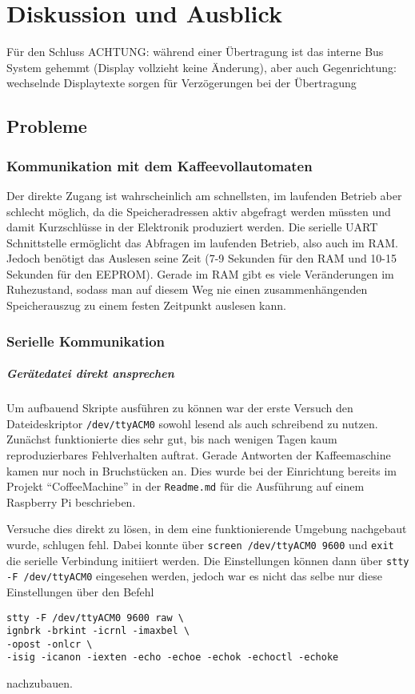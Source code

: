 \chapter{Diskussion und Ausblick}
\todo
Für den Schluss
ACHTUNG: während einer Übertragung ist das interne Bus System gehemmt (Display vollzieht keine Änderung), aber auch Gegenrichtung: wechselnde Displaytexte sorgen für Verzögerungen bei der Übertragung
\todo

\section{Probleme}

\subsection{Kommunikation mit dem Kaffeevollautomaten} \label{subsec:zugangSeriellDirekt}
Der direkte Zugang ist wahrscheinlich am schnellsten, im laufenden Betrieb aber schlecht möglich, da die Speicheradressen aktiv abgefragt werden müssten und damit Kurzschlüsse in der Elektronik produziert werden.
Die serielle \ac{UART} Schnittstelle ermöglicht das Abfragen im laufenden Betrieb, also auch im \ac{RAM}.
Jedoch benötigt das Auslesen seine Zeit (7-9 Sekunden für den \ac{RAM} und 10-15 Sekunden für den \ac{EEPROM}).
Gerade im \ac{RAM} gibt es viele Veränderungen im Ruhezustand, sodass man auf diesem Weg nie einen zusammenhängenden Speicherauszug zu einem festen Zeitpunkt auslesen kann.

\subsection{Serielle Kommunikation} \label{subsec:kommunikationGeraetedateiLibserialLibrary}
\paragraph{Gerätedatei direkt ansprechen}
Um aufbauend Skripte ausführen zu können war der erste Versuch den Dateideskriptor \texttt{/dev/ttyACM0} sowohl lesend als auch schreibend zu nutzen.
Zunächst funktionierte dies sehr gut, bis nach wenigen Tagen kaum reproduzierbares Fehlverhalten auftrat.
Gerade Antworten der Kaffeemaschine kamen nur noch in Bruchstücken an.
Dies wurde bei der Einrichtung bereits im Projekt "`CoffeeMachine"'\cite{GitCoffeeMachine} in der \texttt{Readme.md} für die Ausführung auf einem Raspberry Pi beschrieben.

Versuche dies direkt zu lösen, in dem eine funktionierende Umgebung nachgebaut wurde, schlugen fehl.
Dabei konnte über \texttt{screen /dev/ttyACM0 9600} und \texttt{exit} die serielle Verbindung initiiert werden.
Die Einstellungen können dann über \texttt{stty -F /dev/ttyACM0} eingesehen werden, jedoch war es nicht das selbe nur diese Einstellungen über den Befehl
\begin{lstlisting}[label=lst:stty,caption={stty zum setzen der Verbindungseinstellungen}]
stty -F /dev/ttyACM0 9600 raw \
ignbrk -brkint -icrnl -imaxbel \
-opost -onlcr \
-isig -icanon -iexten -echo -echoe -echok -echoctl -echoke
\end{lstlisting}
nachzubauen.


